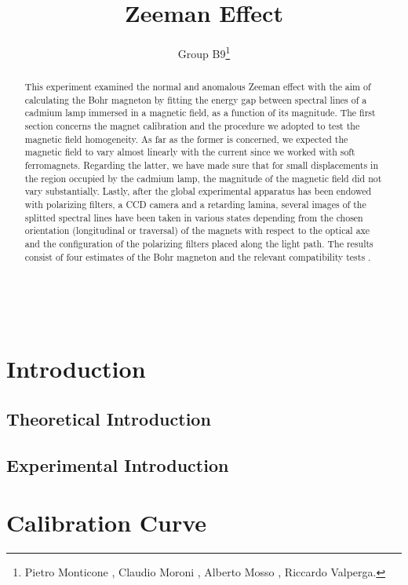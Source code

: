 \documentclass[a4paper,12pt,abstracton]{scrartcl}
\title{Zeeman Effect}
\author{Group B9\footnote{Pietro Monticone , Claudio Moroni , Alberto Mosso , Riccardo Valperga.}}
\begin{document}
\maketitle
\makenomenclature
\begin{abstract}
This experiment examined the normal and anomalous Zeeman effect with the aim of calculating the Bohr magneton by fitting the energy gap between spectral lines of a cadmium lamp immersed in a magnetic field, as a function of its magnitude. The first section concerns the magnet calibration and the procedure we adopted to test the magnetic field homogeneity. As far as the former is concerned, we expected the magnetic field to vary almost linearly with the current since we worked with soft ferromagnets. Regarding the latter, we have made sure that for small displacements in the region occupied by the cadmium lamp, the magnitude of the magnetic field did not vary substantially. Lastly, after the global experimental apparatus has been endowed with polarizing filters, a CCD camera and a retarding lamina, several images of the splitted spectral lines have been taken in various states depending from the chosen orientation (longitudinal or traversal) of the magnets with respect to the optical axe and the configuration of the polarizing filters placed along the light path. The results consist of four estimates of the Bohr magneton and the relevant compatibility tests .
\end{abstract}
\clearpage
\tableofcontents

\mbox{
}
\newpage
\setlength{\columnsep}{27pt} 
\begin{multicols}{2}
\printnomenclature
\end{multicols}
\newpage

\section{Introduction}
\subsection{Theoretical Introduction}
\subsection{Experimental Introduction}
\section{Calibration Curve}
\end{document}
